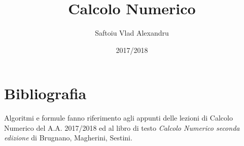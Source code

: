 \documentclass[article, table, xcdraw]{article}
\title{Calcolo Numerico}
\date{2017/2018}
\author{Saftoiu Vlad Alexandru}
\begin{document}
	
	\newcommand{\TODO}[1][]{
		\begin{shaded*} 
			da fare \ifthenelse{\isempty{#1}}{ }{ (: #1 ) }
		\end{shaded*}
	}
	
	\newcommand{\fek}[1]{
		\begin{equation*}
			#1
		\end{equation*}
	}

	\newcommand{\PP}[1][]{
		\ifthenelse{ \isempty{#1} }{ \\[10pt] }{ \\[#1pt] }
	}

	\maketitle
	\newpage

	\tableofcontents
	\newpage
	
	
	
	
	
	
	
	
	
	\section*{Bibliografia}
	Algoritmi e formule fanno riferimento agli appunti delle lezioni di Calcolo Numerico del A.A. 2017/2018 ed al libro di testo \textit{Calcolo Numerico seconda edizione} di Brugnano, Magherini, Sestini.
\end{document}
